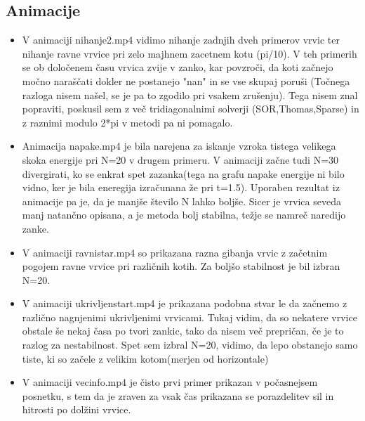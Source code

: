 \documentclass{article}
\begin{document}
\subsection{Animacije}
\begin{itemize}
\item V animaciji nihanje2.mp4 vidimo nihanje zadnjih dveh primerov vrvic ter nihanje ravne vrvice pri zelo majhnem zacetnem kotu (pi/10). V teh primerih se ob določenem času vrvica zvije v zanko, kar povzroči, da koti začnejo močno naraščati dokler ne postanejo "nan" in se vse skupaj poruši (Točnega razloga nisem našel, se je pa to zgodilo pri vsakem zrušenju). Tega nisem znal popraviti, poskusil sem z več tridiagonalnimi solverji (SOR,Thomas,Sparse) in z raznimi modulo 2*pi v metodi pa ni pomagalo.
 

\item Animacija napake.mp4 je bila narejena za iskanje vzroka tistega velikega skoka energije pri N=20 v drugem primeru. V animaciji začne tudi N=30 divergirati, ko se enkrat spet zazanka(tega na grafu napake energije ni bilo vidno, ker je bila eneregija izračunana že pri t=1.5). Uporaben rezultat iz animacije pa je, da je manjše število N lahko boljše. Sicer je vrvica seveda manj natančno opisana, a je metoda bolj stabilna, težje se namreč naredijo zanke.

\item V animaciji ravnistar.mp4 so prikazana razna gibanja vrvic z začetnim pogojem ravne vrvice pri različnih kotih. Za boljšo stabilnost je bil izbran N=20.

\item V animaciji ukrivljenstart.mp4 je prikazana podobna stvar le da začnemo z različno nagnjenimi ukrivljenimi vrvicami. Tukaj vidim, da so nekatere vrvice obstale še nekaj časa po tvori zankic, tako da nisem več prepričan, če je to razlog za nestabilnost. Spet sem izbral N=20, vidimo, da lepo obstanejo samo tiste, ki so začele z velikim kotom(merjen od horizontale)

\item V animaciji vecinfo.mp4 je čisto prvi primer prikazan v počasnejsem posnetku, s tem da je zraven za vsak čas prikazana se porazdelitev sil in hitrosti po dolžini vrvice.
\end{itemize}
\end{document}
